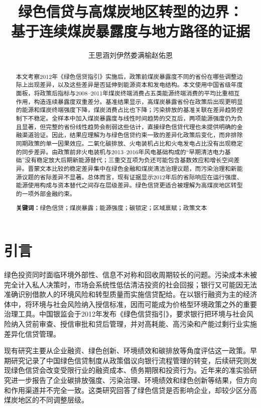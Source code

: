 \documentclass[UTF8,12pt]{ctexart}
\title{绿色信贷与高煤炭地区转型的边界：\\基于连续煤炭暴露度与地方路径的证据}
\author{王思涵\quad 刘伊然\quad 娄满榆\quad 赵佑恩}
\date{}
\begin{document}
\maketitle

\begin{abstract}
本文考察2012年《绿色信贷指引》实施后，政策前煤炭暴露度不同的省份在哪些调整边际上出现差异，以及这些差异是否延伸到能源资本和发电结构。本文使用中国省级年度面板，将政策后指标与2008--2011年煤炭终端消费占五类能源终端消费的平均比重相互作用，构造连续暴露度双重差分。基准结果显示，高煤炭暴露省份在政策后出现更明显的能源和煤炭终端强度下降，煤炭消费占比也下降；污染排放的基准关联在差异趋势控制下不稳定。全样本中加入煤炭暴露度与线性时间趋势的交互后，两项能源强度仍为负且显著，但完整的省份线性趋势会削弱这些估计，直接绿色信贷代理也未提供明确的金融渠道验证。因此，结果应理解为与绿色信贷约束一致的差异化政策后变化，而非排除同期政策的单一因果效应。二氧化碳排放、火电装机占比和火电发电占比没有出现稳定的同步差异。由政策前非火电装机与2013--2016年风电基础构成的“早期清洁电力基础”没有稳定放大后期新能源替代；三重交互项为负还可能包含基数效应和增长空间差异。晋蒙文本比较的稳定差异集中在绿色金融和煤炭清洁治理议题，而污染治理和新能源议题的省际差异不显著。总体而言，现有证据显示2012年后的省际响应在运行强度、能源使用构成与资本替代之间存在层级差异。绿色信贷更适合被理解为高煤炭地区转型的一项外部金融约束。

\noindent\textbf{关键词：}绿色信贷；煤炭暴露；能源强度；碳锁定；区域禀赋；政策文本
\end{abstract}

\section{引言}

绿色投资同时面临环境外部性、信息不对称和回收周期较长的问题。污染成本未被完全计入私人决策时，市场会系统性低估清洁投资的社会回报\parencite{pigou1920}；银行又可能因无法准确识别借款人的环境风险和转型质量而实施信贷配给\parencite{stiglitzweiss1981}。在以银行融资为主的经济体中，将环境与社会风险纳入授信标准，因而可能成为价格型环境政策之外的重要治理工具\parencite{campiglio2016,dikauvolz2021}。中国银监会于2012年发布《绿色信贷指引》，要求银行把环境与社会风险纳入贷前审查、授信审批和贷后管理，并对高耗能、高污染和产能过剩行业实施差异化信贷管理\parencite{cbrc2012}。

现有研究主要从企业融资、绿色创新、环境绩效和碳排放等角度评估这一政策。早期研究记录了中国绿色信贷制度从政策倡议向银行流程管理的转变\parencite{aizawayang2010,zhangyangbi2011}，后续研究则发现绿色信贷会改变受限行业的融资成本、债务期限和投资行为\parencite{cuietal2018,xuli2020}。近年来的准实验研究进一步报告了企业碳排放强度、污染治理、环境绩效和绿色创新等结果，但方向和作用渠道并不完全一致\parencite{xuyetal2023,wuetal2023,zhangetal2024green,laietal2024,lietal2024,pengetal2024,machen2025,zhengetal2025,zhangetal2025micro}。这类研究回答了绿色信贷是否影响企业，却较少区分高煤炭地区的不同调整层级。
\end{document}

